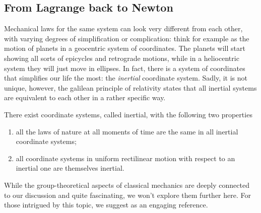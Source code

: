 \documentclass[english,fontsize=11pt,paper=b5]{scrbook}
\theoremstyle{definition}
\begin{document}
    \subsection{From Lagrange back to Newton}\label{sec:dynamicspps}

    Mechanical laws for the same system can look very different from each other, with varying degrees of simplification or complication: think for example as the motion of planets in a geocentric system of coordinates. The planets will start showing all sorts of epicycles and retrograde motions, while in a heliocentric system they will just move in ellipses.
    In fact, there is a system of coordinates that simplifies our life the most: the \emph{inertial} coordinate system.
    Sadly, it is not unique, however, the galilean principle of relativity states that all inertial systems are equivalent to each other in a rather specific way.

    \begin{tcolorbox}[title=Galilean principle of relativity]
      There exist coordinate systems, called inertial, with the following two properties
      \begin{enumerate}
        \item all the laws of nature at all moments of time are the same in all inertial coordinate systems;
        \item all coordinate systems in uniform rectilinear motion with respect to an inertial one are themselves inertial.
      \end{enumerate}
    \end{tcolorbox}

    While the group-theoretical aspects of classical mechanics are deeply connected to our discussion and quite fascinating, we won't explore them further here.
    For those intrigued by this topic, we suggest \cite{book:marsdenratiu} as an engaging reference.
\end{document}

